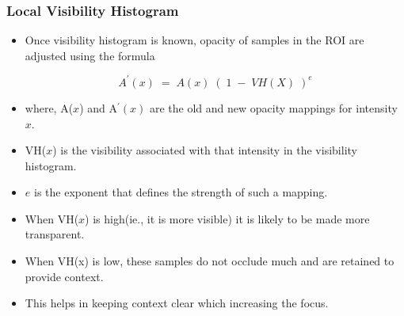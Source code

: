 \documentclass{beamer}
\begin{document}


\begin{frame}
\frametitle{Local Visibility Histogram}
\begin{itemize}
\item Once visibility histogram is known, opacity of samples in the ROI are adjusted using the formula

\begin{equation} 
A^{'}(x) \; = \; A(x) \; ( \; 1 \; - \; VH(X) \; )^{e} 
\end{equation}

\item where, A($x$) and A$^{'}(x)$ are the old and new opacity mappings for intensity $x$.
\item VH($x$) is the visibility associated with that intensity in the visibility histogram.
\item $e$ is the exponent that defines the strength of such a mapping.
\item When VH($x$) is high(ie., it is more visible) it is likely to be made more transparent. 
\item When VH(x) is low, these samples do not occlude much and are retained to provide context. \\
\item This helps in keeping context clear which increasing the focus. 

\end{itemize}
\end{frame}


\end{document}
